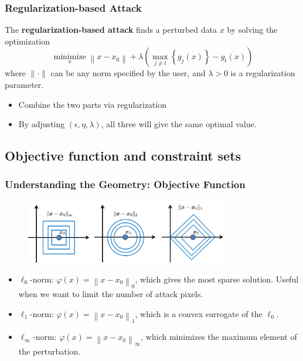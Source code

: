 \documentclass[8pt,dvipsnames]{beamer}
\newenvironment{customtheorem}[1]
{%
	\tcolorbox[
	enhanced,
	colback=blue!5,
	colframe=blue!60!black,
	coltitle=black,
	colbacktitle=blue!5,
	fonttitle=\bfseries,
	attach boxed title to top left={yshift=-2mm, xshift=2mm},
	boxed title style={sharp corners},
	sharp corners,
	title=#1
	]
}
{%
	\endtcolorbox
}
\begin{document}
\begin{frame}
	\frametitle{Regularization-based Attack}
	\begin{customtheorem}{Regularization-based Attack}
		The \textbf{regularization-based attack} finds a perturbed data \(x\) by solving the optimization 
		$$
		\underset{x}{\operatorname{minimize}}\left\|x-x_{0}\right\|+\lambda\left(\max _{j \neq t}\left\{g_{j}(x)\right\}-g_{t}(x)\right)
		$$
		where \(\|\cdot\|\) can be any norm specified by the user, and \(\lambda>0\) is a regularization parameter.
	\end{customtheorem}
	\begin{itemize}
		\item Combine the two parts via regularization
		\item By adjusting \((\epsilon, \eta, \lambda)\), all three will give the same optimal value.
	\end{itemize}
\end{frame}

\subsection{Objective function and constraint sets}
\begin{frame}
	\frametitle{Understanding the Geometry: Objective Function}
	\begin{figure}[htbp]
		\centering
		\includegraphics[width=0.8\textwidth]{imgs/adv_overview_14.png}
	\end{figure}
	\begin{itemize}
		\item \(\ell_{0}\)-norm: \(\varphi(x)=\left\|x-x_{0}\right\|_{0}\), which gives the most sparse solution. Useful when we want to limit the number of attack pixels.
		\item \(\ell_{1}\)-norm: \(\varphi(x)=\left\|x-x_{0}\right\|_{1}\), which is a convex surrogate of the \(\ell_{0}\). 
		\item \(\ell_{\infty}\)-norm: \(\varphi(x)=\left\|x-x_{0}\right\|_{\infty}\), which minimizes the maximum element of the perturbation. 
	\end{itemize}
	
\end{frame}
\end{document}
